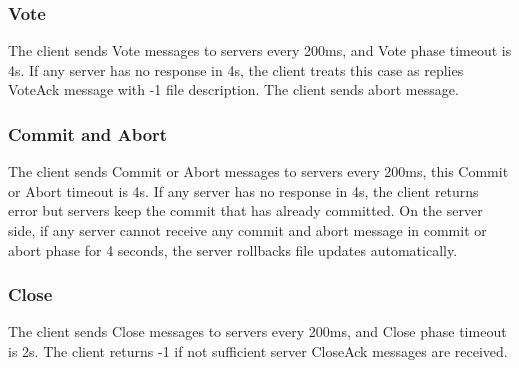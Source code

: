 \documentclass[12pt,fleqn]{article}
\begin{document}
\subsubsection{Vote}
The client sends Vote messages to servers every 200ms, and Vote phase timeout is 4s. If any server has no response in 4s, the client treats this case as replies VoteAck message with -1 file description. The client sends abort message.

\subsubsection{Commit and Abort}
The client sends Commit or Abort messages to servers every 200ms, this Commit or Abort timeout is 4s. If any server has no response in 4s, the client returns error but servers keep the commit that has already committed. On the server side, if any server cannot receive any commit and abort message in commit or abort phase for 4 seconds, the server rollbacks file updates automatically.
 
 \subsubsection{Close}
The client sends Close messages to servers every 200ms, and Close phase timeout is 2s. The client returns -1 if not sufficient server CloseAck messages are received.
 
\end{document}
